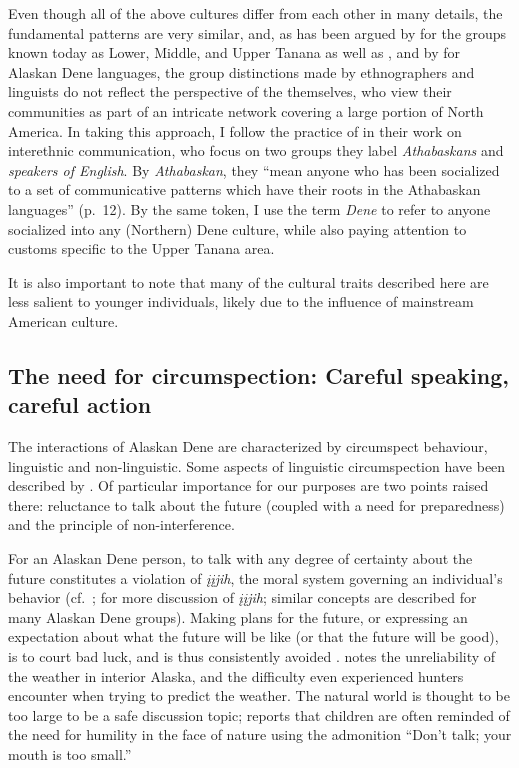 \documentclass[output=paper,colorlinks,citecolor=brown]{langscibook}
\begin{document}
Even though all of the above cultures differ from each other in many details, the fundamental patterns are very similar, and, as has been argued by \citet{McKennanR1981} for the groups known today as Lower, Middle, and Upper Tanana as well as , and by \citet{KraussM2000Koydialects} for Alaskan Dene languages, the group distinctions made by ethnographers and linguists do not reflect the perspective of the  themselves, who view their communities as part of an intricate network covering a large portion of North America. In taking this approach, I follow the practice of \citet{ScollonRScollonS1981} in their work on interethnic communication, who focus on two groups they label \textit{Athabaskans} and \textit{speakers of English}. By \textit{Athabaskan}, they ``mean anyone who has been socialized to a set of communicative patterns which have their roots in the Athabaskan languages'' (p.\ 12).  By the same token, I use the term \textit{Dene} to refer to anyone socialized into any (Northern) Dene culture, while also paying attention to customs specific to the Upper Tanana area. 

It is also important to note that many of the cultural traits described here are less salient to younger individuals, likely due to the influence of mainstream American culture.

\subsection{The need for circumspection: Careful speaking, careful action}
\label{subsection:careful-action}

The interactions of Alaskan Dene are characterized by circumspect behaviour, linguistic and non-linguistic. Some aspects of linguistic circumspection have been described by \citet{ScollonRScollonS1981}. Of particular importance for our purposes are two points raised there: reluctance to talk about the future (coupled with a need for preparedness) and the principle of non-interference.

For an Alaskan Dene person, to talk with any degree of certainty about the future constitutes a violation of \textit{įįjih}, the moral system governing an individual's behavior (cf.\  \citealt[chap.\ 3]{GuedonMF2005}; \citealt{LovickO2016, LovickOTuttleS2019} for more discussion of  \textit{įįjih}; similar concepts are described for many Alaskan Dene groups). Making plans for the future, or expressing an expectation about what the future will be like (or that the future will be good), is to court bad luck, and is thus consistently avoided \citep[20]{ScollonRScollonS1981}.  \citet[194--195]{NelsonR1973} notes the unreliability of the weather in interior Alaska, and the difficulty even experienced hunters encounter when trying to predict the weather. The natural world is thought to be too large to be a safe discussion topic; \citet[45]{NelsonR1983} reports that  children are often reminded of the need for humility in the face of nature using the admonition ``Don't talk; your mouth is too small.''
\end{document}
